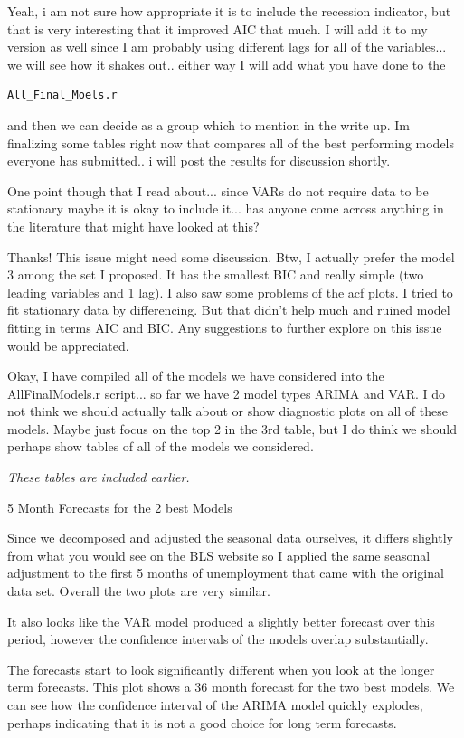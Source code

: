 \documentclass[twoside,twocolumn]{article}
\begin{document}
Yeah, i am not sure how appropriate it is to include the recession indicator, but that is very interesting that it improved AIC that much. I will add it to my version as well since I am probably using different lags for all of the variables... we will see how it shakes out.. either way I will add what you have done to the \begin{verbatim}All_Final_Moels.r\end{verbatim} and then we can decide as a group which to mention in the write up. Im finalizing some tables right now that compares all of the best performing models everyone has submitted.. i will post the results for discussion shortly.

One point though that I read about... since VARs do not require data to be stationary maybe it is okay to include it... has anyone come across anything in the literature that might have looked at this?

Thanks! This issue might need some discussion. Btw, I actually prefer the model 3 among the set I proposed. It has the smallest BIC and really simple (two leading variables and 1 lag). I also saw some problems of the acf plots. I tried to fit stationary data by differencing. But that didn't help much and ruined model fitting in terms AIC and BIC. Any suggestions to further explore on this issue would be appreciated.

Okay, I have compiled all of the models we have considered into the AllFinalModels.r script... so far we have 2 model types ARIMA and VAR. I do not think we should actually talk about or show diagnostic plots on all of these models. Maybe just focus on the top 2 in the 3rd table, but I do think we should perhaps show tables of all of the models we considered.

\textit{These tables are included earlier.}

5 Month Forecasts for the 2 best Models

Since we decomposed and adjusted the seasonal data ourselves, it differs slightly from what you would see on the BLS website so I applied the same seasonal adjustment to the first 5 months of unemployment that came with the original data set. Overall the two plots are very similar.

It also looks like the VAR model produced a slightly better forecast over this period, however the confidence intervals of the models overlap substantially.

The forecasts start to look significantly different when you look at the longer term forecasts. This plot shows a 36 month forecast for the two best models. We can see how the confidence interval of the ARIMA model quickly explodes, perhaps indicating that it is not a good choice for long term forecasts.
\end{document}
